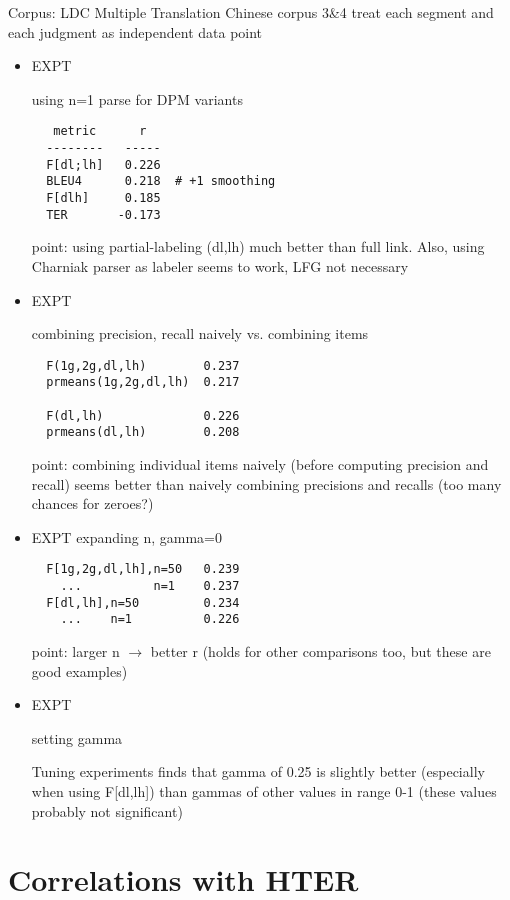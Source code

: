 \documentclass{kluwer}    %
\begin{document}
\begin{article}
Corpus: LDC Multiple Translation Chinese corpus 3\&4 treat each
segment and each judgment as independent data point

\begin{itemize}
\item EXPT

  using n=1 parse for DPM variants

\begin{verbatim}
   metric      r
  --------   -----
  F[dl;lh]   0.226
  BLEU4      0.218  # +1 smoothing
  F[dlh]     0.185
  TER       -0.173
\end{verbatim}

  point: using partial-labeling (dl,lh) much better than full
  link. Also, using Charniak parser as labeler seems to work, LFG not
  necessary

\item EXPT 

  combining precision, recall naively vs. combining items

\begin{verbatim}
  F(1g,2g,dl,lh)        0.237
  prmeans(1g,2g,dl,lh)  0.217

  F(dl,lh)              0.226
  prmeans(dl,lh)        0.208
\end{verbatim}

  point: combining individual items naively (before computing
  precision and recall) seems better than naively combining precisions
  and recalls (too many chances for zeroes?)

\item EXPT
  expanding n, gamma=0

\begin{verbatim}
  F[1g,2g,dl,lh],n=50   0.239
    ...          n=1    0.237
  F[dl,lh],n=50         0.234
    ...    n=1          0.226
\end{verbatim}
  point: larger n $\to$ better r
  (holds for other comparisons too, but these are good examples)

\item  EXPT

  setting gamma

  Tuning experiments finds that gamma of 0.25 is slightly better
  (especially when using F[dl,lh]) than gammas of other values in
  range 0-1 (these values probably not significant)

\end{itemize}

\section{Correlations with HTER}


\end{article}
\end{document}
